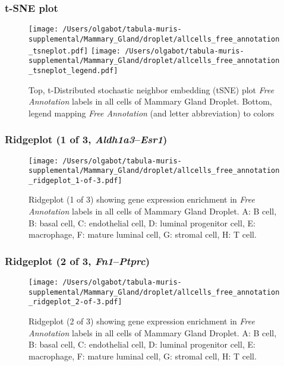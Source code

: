 \clearpage
\subsubsection{t-SNE plot}
\begin{figure}[h]
\centering
\texttt{[image: /Users/olgabot/tabula-muris-supplemental/Mammary\_Gland/droplet/allcells\_free\_annotation\_tsneplot.pdf]}
\texttt{[image: /Users/olgabot/tabula-muris-supplemental/Mammary\_Gland/droplet/allcells\_free\_annotation\_tsneplot\_legend.pdf]}
\caption{Top, t-Distributed stochastic neighbor embedding (tSNE) plot  \emph{Free Annotation} labels in all cells of Mammary Gland Droplet. Bottom, legend mapping \emph{Free Annotation} (and letter abbreviation) to colors}
\end{figure}


\clearpage

\subsubsection{Ridgeplot (1 of 3, \emph{Aldh1a3}--\emph{Esr1})}
\begin{figure}[h]
\centering
\texttt{[image: /Users/olgabot/tabula-muris-supplemental/Mammary\_Gland/droplet/allcells\_free\_annotation\_ridgeplot\_1-of-3.pdf]}

\caption{ Ridgeplot (1 of 3)  showing gene expression enrichment in \emph{Free Annotation} labels in all cells of Mammary Gland Droplet. A: B cell, B: basal cell, C: endothelial cell, D: luminal progenitor cell, E: macrophage, F: mature luminal cell, G: stromal cell, H: T cell.}
\end{figure}


\clearpage

\subsubsection{Ridgeplot (2 of 3, \emph{Fn1}--\emph{Ptprc})}
\begin{figure}[h]
\centering
\texttt{[image: /Users/olgabot/tabula-muris-supplemental/Mammary\_Gland/droplet/allcells\_free\_annotation\_ridgeplot\_2-of-3.pdf]}

\caption{ Ridgeplot (2 of 3)  showing gene expression enrichment in \emph{Free Annotation} labels in all cells of Mammary Gland Droplet. A: B cell, B: basal cell, C: endothelial cell, D: luminal progenitor cell, E: macrophage, F: mature luminal cell, G: stromal cell, H: T cell.}
\end{figure}


